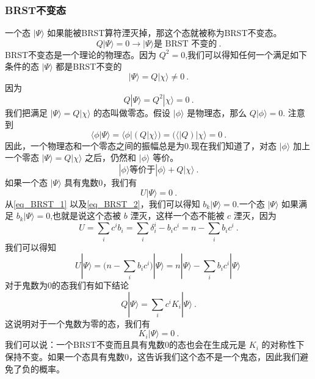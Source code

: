 \subsubsection{BRST不变态}
一个态 $|\Psi\rangle$ 如果能被BRST算符湮灭掉，那这个态就被称为BRST不变态。
\begin{equation}
Q|\Psi\rangle = 0 \rightarrow |\Psi\rangle \text{是 BRST 不变的}~.
\end{equation}
BRST不变态是一个理论的物理态。因为 $Q^2=0$,我们可以得知任何一个满足如下条件的态 $|\Psi\rangle$ 都是BRST不变的
\begin{equation}
|\Psi\rangle = Q |\chi\rangle \neq 0~.
\end{equation}
因为
\begin{equation}
Q|\Psi\rangle = Q^2 |\chi\rangle = 0~.
\end{equation}
我们把满足 $|\Psi\rangle=Q|\chi\rangle$ 的态叫做零态。假设 $|\phi\rangle$ 是物理态，那么 $Q|\phi\rangle=0$. 注意到
\begin{equation}
\langle\phi|\Psi\rangle = \langle\phi|(Q|\chi\rangle) = (\langle | Q) |\chi\rangle = 0~.
\end{equation}
因此，一个物理态和一个零态之间的振幅总是为0.现在我们知道了，对态 $|\phi\rangle$ 加上一个零态 $|\Psi\rangle = Q|\chi\rangle$ 之后，仍然和 $|\phi\rangle$ 等价。
\begin{equation}
|\phi\rangle \text{等价于} |\phi\rangle+Q|\chi\rangle~.
\end{equation}
如果一个态 $|\Psi\rangle$ 具有鬼数0，我们有
\begin{equation}\label{eq_BRST_2}
U|\Psi\rangle = 0~.
\end{equation}
从\autoref{eq_BRST_1} 以及\autoref{eq_BRST_2}，我们可以得知 $b_k|\Psi\rangle = 0$.一个态 $|\Psi\rangle$ 如果满足 $b_k|\Psi\rangle = 0$,也就是说这个态被 $b$ 湮灭，这样一个态不能被 $c$ 湮灭，因为
\begin{equation}
U = \sum_i c^i b_i = \sum_i \delta^i_i - b_i c^i = n - \sum_i b_i c^i~.
\end{equation}
我们可以得知
\begin{equation}
U|\Psi\rangle = \bigg( n - \sum_i b_i c^i \bigg) | \Psi\rangle = n|\Psi\rangle - \sum_i b_i c^i |\Psi\rangle~
\end{equation}
对于鬼数为0的态我们有如下结论
\begin{equation}
Q|\Psi\rangle = \sum_i c^i K_i |\Psi\rangle~.
\end{equation}
这说明对于一个鬼数为零的态，我们有
\begin{equation}
K_i|\Psi\rangle = 0~.
\end{equation}
我们可以说：一个BRST不变而且具有鬼数0的态也会在生成元是 $K_i$ 的对称性下保持不变。如果一个态具有鬼数0，这告诉我们这个态不是一个鬼态，因此我们避免了负的概率。

